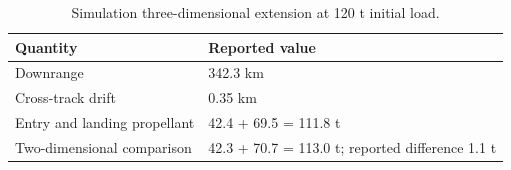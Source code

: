 \begin{table}[htbp]
\caption{Simulation three-dimensional extension at 120 t initial load.}
\label{tab:src10}
\small
\setlength{\tabcolsep}{3.5pt}
\begin{tabularx}{\linewidth}{@{}p{.36\linewidth}X@{}}
\toprule
Quantity & Reported value \\
\midrule
Downrange & 342.3 km \\
Cross-track drift & 0.35 km \\
Entry and landing propellant & 42.4 + 69.5 = 111.8 t \\
Two-dimensional comparison & 42.3 + 70.7 = 113.0 t; reported difference 1.1 t \\
\bottomrule
\end{tabularx}
\par{}
\end{table}
